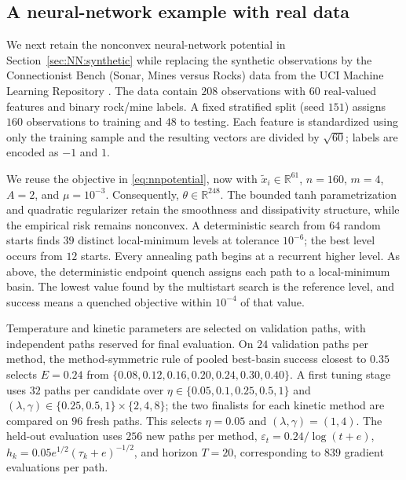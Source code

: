 \documentclass[11pt]{article}
\theoremstyle{definition}
\newcommand{\R}{\mathbb R}
\newcommand{\eps}{\varepsilon}
\begin{document}
\subsection{A neural-network example with real data}\label{sec:NN:real}

We next retain the nonconvex neural-network potential in Section~\ref{sec:NN:synthetic} while replacing the
synthetic observations by the Connectionist Bench (Sonar, Mines versus Rocks)
data from the UCI Machine Learning Repository \cite{GormanSejnowski1988Sonar}.
The data contain $208$ observations with $60$ real-valued features and binary
rock/mine labels.  A fixed stratified split (seed $151$) assigns $160$
observations to training and $48$ to testing.  Each feature is standardized
using only the training sample and the resulting vectors are divided by
$\sqrt{60}$; labels are encoded as $-1$ and $1$.

We reuse the objective in \eqref{eq:nnpotential}, now with
$\widetilde x_i\in\R^{61}$, $n=160$, $m=4$, $A=2$, and $\mu=10^{-3}$.
Consequently, $\theta\in\R^{248}$.  The bounded tanh parametrization and
quadratic regularizer retain the smoothness and dissipativity structure, while
the empirical risk remains nonconvex.  A deterministic search from $64$ random
starts finds $39$ distinct local-minimum levels at tolerance $10^{-6}$; the
best level occurs from $12$ starts. Every annealing path begins at a recurrent
higher level. As above, the deterministic endpoint quench assigns each path
to a local-minimum basin. The lowest value found by the multistart search is
the reference level, and success means a quenched objective within $10^{-4}$
of that value.

Temperature and kinetic parameters are selected on validation paths, with
independent paths reserved for final evaluation.
On $24$ validation paths per method, the method-symmetric rule of pooled
best-basin success closest to $0.35$ selects $E=0.24$ from
$\{0.08,0.12,0.16,0.20,0.24,0.30,0.40\}$.
A first tuning stage uses $32$ paths per candidate over
$\eta\in\{0.05,0.1,0.25,0.5,1\}$ and
$(\lambda,\gamma)\in\{0.25,0.5,1\}\times\{2,4,8\}$; the two finalists for
each kinetic method are compared on $96$ fresh paths.  This selects
$\eta=0.05$ and $(\lambda,\gamma)=(1,4)$.  The held-out evaluation uses $256$
new paths per method, $\eps_t=0.24/\log(t+e)$,
$h_k=0.05e^{1/2}(\tau_k+e)^{-1/2}$, and horizon $T=20$, corresponding to $839$
gradient evaluations per path.
\end{document}
